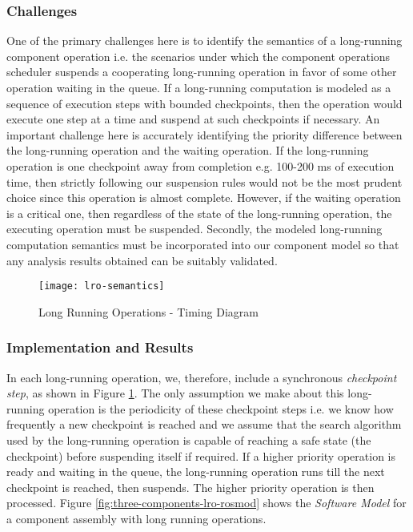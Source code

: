 \subsubsection{Challenges}

One of the primary challenges here is to identify the semantics of a long-running component operation i.e. the scenarios under which the component operations scheduler suspends a cooperating long-running operation in favor of some other operation waiting in the queue. If a long-running computation is modeled as a sequence of execution steps with bounded checkpoints, then the operation would execute one step at a time and suspend at such checkpoints if necessary. An important challenge here is accurately identifying the priority difference between the long-running operation and the waiting operation. If the long-running operation is one checkpoint away from completion e.g. 100-200 ms of execution time, then strictly following our suspension rules would not be the most prudent choice since this operation is almost complete. However, if the waiting operation is a critical one, then regardless of the state of the long-running operation, the executing operation must be suspended. Secondly, the modeled long-running computation semantics must be incorporated into our component model so that any analysis results obtained can be suitably validated. 

\begin{figure}[h]
	\centering
	\texttt{[image: lro-semantics]}
	\caption{Long Running Operations - Timing Diagram}
	\label{fig:lro-semantics}
\end{figure}
\FloatBarrier

\subsubsection{Implementation and Results}

In each long-running operation, we, therefore, include a synchronous \emph{checkpoint step}, as shown in Figure \ref{fig:lro-semantics}. The only assumption we make about this long-running operation is the periodicity of these checkpoint steps i.e. we know how frequently a new checkpoint is reached and we assume that the search algorithm used by the long-running operation is capable of reaching a safe state (the checkpoint) before suspending itself if required. If a higher priority operation is ready and waiting in the queue, the long-running operation runs till the next checkpoint is reached, then suspends. The higher priority operation is then processed. Figure \ref{fig:three-components-lro-rosmod} shows the \emph{Software Model} for a component assembly with long running operations.


